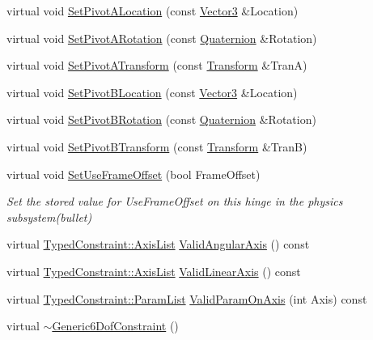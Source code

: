\begin{DoxyCompactItemize}
virtual void \hyperlink{classMezzanine_1_1Generic6DofConstraint_a4670a488bc5cab478c6d69c8a0d240a5}{SetPivotALocation} (const \hyperlink{classMezzanine_1_1Vector3}{Vector3} \&Location)
\item 
virtual void \hyperlink{classMezzanine_1_1Generic6DofConstraint_a34027d82e3b8c09c6cd488335ea343bb}{SetPivotARotation} (const \hyperlink{classMezzanine_1_1Quaternion}{Quaternion} \&Rotation)
\item 
virtual void \hyperlink{classMezzanine_1_1Generic6DofConstraint_a88f26ccb9a6ec67adc743d4bc7c86ddf}{SetPivotATransform} (const \hyperlink{classMezzanine_1_1Transform}{Transform} \&TranA)
\item 
virtual void \hyperlink{classMezzanine_1_1Generic6DofConstraint_a1b5fc577a2c627266436fd5b134728bc}{SetPivotBLocation} (const \hyperlink{classMezzanine_1_1Vector3}{Vector3} \&Location)
\item 
virtual void \hyperlink{classMezzanine_1_1Generic6DofConstraint_afd149f6868de162f75a3e2293d6c143d}{SetPivotBRotation} (const \hyperlink{classMezzanine_1_1Quaternion}{Quaternion} \&Rotation)
\item 
virtual void \hyperlink{classMezzanine_1_1Generic6DofConstraint_adaa5bb038814aa287773f56d40e90210}{SetPivotBTransform} (const \hyperlink{classMezzanine_1_1Transform}{Transform} \&TranB)
\item 
virtual void \hyperlink{classMezzanine_1_1Generic6DofConstraint_a1181f8eed94d0e8ec4d5b7230e241d95}{SetUseFrameOffset} (bool FrameOffset)
\begin{DoxyCompactList}\small\item\em Set the stored value for UseFrameOffset on this hinge in the physics subsystem(bullet) \item\end{DoxyCompactList}\item 
virtual \hyperlink{classMezzanine_1_1TypedConstraint_ac6b8e0839cd686f73d0c9e9ad5db47a4}{TypedConstraint::AxisList} \hyperlink{classMezzanine_1_1Generic6DofConstraint_a8a908f5f3857262db217a7f2dfc25c61}{ValidAngularAxis} () const 
\item 
virtual \hyperlink{classMezzanine_1_1TypedConstraint_ac6b8e0839cd686f73d0c9e9ad5db47a4}{TypedConstraint::AxisList} \hyperlink{classMezzanine_1_1Generic6DofConstraint_a94db83422c1984cdbe1745662715ac9d}{ValidLinearAxis} () const 
\item 
virtual \hyperlink{classMezzanine_1_1TypedConstraint_abd499db29c9e9755e9bb547d29eaa49a}{TypedConstraint::ParamList} \hyperlink{classMezzanine_1_1Generic6DofConstraint_a2417bed78c50820d2b5b8d083a8897d6}{ValidParamOnAxis} (int Axis) const 
\item 
\hypertarget{classMezzanine_1_1Generic6DofConstraint_a13e111a96aa15ccd2107c8910236471b}{
virtual \hyperlink{classMezzanine_1_1Generic6DofConstraint_a13e111a96aa15ccd2107c8910236471b}{$\sim$Generic6DofConstraint} ()}
\label{classMezzanine_1_1Generic6DofConstraint_a13e111a96aa15ccd2107c8910236471b}


\end{DoxyCompactItemize}
